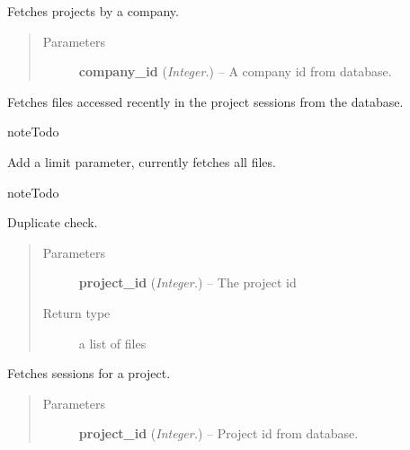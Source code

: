 \documentclass[letterpaper,10pt,english]{sphinxmanual}
\begin{document}

\begin{fulllineitems}
\label{api:controller.GetProjectsByCompany}
Fetches projects by a company.
\begin{quote}\begin{description}
\item[{Parameters}] \leavevmode
\textbf{company\_id} (\emph{Integer.}) -- A company id from database.

\end{description}\end{quote}

\end{fulllineitems}


\begin{fulllineitems}
\label{api:controller.GetRecentFiles}
Fetches files accessed recently in the project sessions from the
database.

\begin{notice}{note}{Todo}

Add a limit parameter, currently fetches all files.
\end{notice}

\begin{notice}{note}{Todo}

Duplicate check.
\end{notice}
\begin{quote}\begin{description}
\item[{Parameters}] \leavevmode
\textbf{project\_id} (\emph{Integer.}) -- The project id

\item[{Return type}] \leavevmode
a list of files

\end{description}\end{quote}

\end{fulllineitems}


\begin{fulllineitems}
\label{api:controller.GetSessionsByProject}
Fetches sessions for a project.
\begin{quote}\begin{description}
\item[{Parameters}] \leavevmode
\textbf{project\_id} (\emph{Integer.}) -- Project id from database.

\end{description}\end{quote}

\end{fulllineitems}
\end{document}
